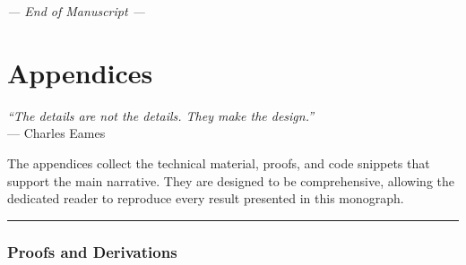 \bigskip
\begin{flushright}
\emph{— End of Manuscript —}
\end{flushright}


\appendix
\part*{Appendices}
\begin{center}
\emph{“The details are not the details. They make the design.”}\\
— Charles Eames
\end{center}
\bigskip

The appendices collect the technical material, proofs, and code snippets that support the main narrative. They are designed to be comprehensive, allowing the dedicated reader to reproduce every result presented in this monograph.

\bigskip
\hrule
\bigskip

\newpage

\section{Proofs and Derivations}
\label{app:proofs}

